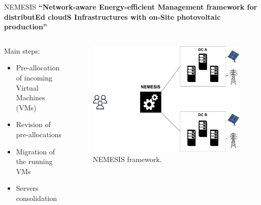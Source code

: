 \documentclass[Ligatures=TeX,table,svgnames,usetotalslideindicator,compress,10pt,aspectratio=169]{beamer}
\begin{document}
\begin{frame}{NEMESIS}
  \textbf {``\alert{N}etwork-aware \alert{E}nergy-efficient
    \alert{M}anagement framework for distribut\alert{E}d
    cloud\alert{S} \alert{I}nfrastructures with on-\alert{S}ite
    photovoltaic production''}  
  \begin{columns}        
    \begin{column}{0.4\textwidth}
Main steps:
\small
\begin{itemize}
    \item Pre-allocation of incoming Virtual Machines (VMs)
    \item Revision of pre-allocations
    \item Migration of the running VMs
    \item Servers consolidation
\end{itemize}
\end{column}   

\begin{column}{0.6\textwidth}
      \begin{figure}[!h]
        \centering
        \includegraphics[width=.85\textwidth]{images/nemesis.pdf}
        \caption{NEMESIS framework.}
      \end{figure}
    \end{column}        

\end{columns}
\end{frame}
\addtocounter{framenumber}{-1}
\end{document}

